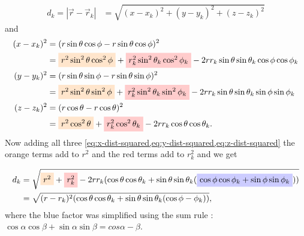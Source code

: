 \begin{align}
    d_k = \left|\vec{r} - \vec{r}_k \right| &= \sqrt{(x-x_k)^2 + (y-y_k)^2 + (z-z_k)^2}
\end{align}
and
\begin{align}
    (x-x_k)^2 &= (r\sin{\theta}\cos{\phi} - r\sin{\theta}\cos{\phi})^2 \notag \\
    &= \tikz[baseline]{
        \node[fill=orange!20,anchor=base]
        {\(r^2\sin^2{\theta}\cos^2{\phi}\)}
    } + \tikz[baseline]{
        \node[fill=red!20,anchor=base]
        {\(r_k^2\sin^2{\theta_k}\cos^2{\phi_k}\)}
    } - 2r r_k \sin{\theta}\sin{\theta_k}\cos{\phi}\cos{\phi_k} \label{eq:x-dist-squared} \\
    (y-y_k)^2 &= (r\sin{\theta}\sin{\phi} - r\sin{\theta}\sin{\phi})^2 \notag \\
    &= \tikz[baseline]{
        \node[fill=orange!20,anchor=base]
        {\(r^2\sin^2{\theta}\sin^2{\phi}\)}
    } + \tikz[baseline]{
        \node[fill=red!20,anchor=base]
        {\(r_k^2\sin^2{\theta_k}\sin^2{\phi_k}\)}
    } - 2r r_k \sin{\theta}\sin{\theta_k}\sin{\phi}\sin{\phi_k} \label{eq:y-dist-squared} \\
    (z-z_k)^2 &= (r\cos{\theta} - r\cos{\theta})^2 \notag \\
    &= \tikz[baseline]{
        \node[fill=orange!20,anchor=base]
        {\(r^2\cos^2{\theta}\)}
    } + \tikz[baseline]{
        \node[fill=red!20,anchor=base]
        {\(r_k^2\cos^2{\theta_k}\)}
    } - 2r r_k \cos{\theta}\cos{\theta_k}. \label{eq:z-dist-squared}
\end{align}
Now adding all three \cref{eq:x-dist-squared,eq:y-dist-squared,eq:z-dist-squared} the orange terms add to \(r^2\) and the red terms add to \(r_k^2\) and we get

\begin{align}
    d_k &= \sqrt{
        \tikz[baseline]{\node[fill=orange!20,anchor=base]{\(r^2\)}}
        + \tikz[baseline]{\node[fill=red!20,anchor=base]{\(r_k^2\)}}
        -2r r_k(\cos{\theta}\cos{\theta_k}+\sin{\theta}\sin{\theta_k}(
            \tikz[baseline]{\node[fill=blue!20,anchor=base]{
                \(\cos{\phi}\cos{\phi_k} + \sin{\phi}\sin{\phi_k}\)}}
        ))
    } \\
    &= \sqrt{(r - r_k)^2(\cos{\theta}\cos{\theta_k}+\sin{\theta}\sin{\theta_k}(\cos{\phi - \phi_k}))},
\end{align}
where the blue factor was simplified using the sum rule \cite{WeissteinTrig}: \\
\(\cos{\alpha}\cos{\beta} + \sin{\alpha}\sin{\beta} = cos{\alpha-\beta}\).

